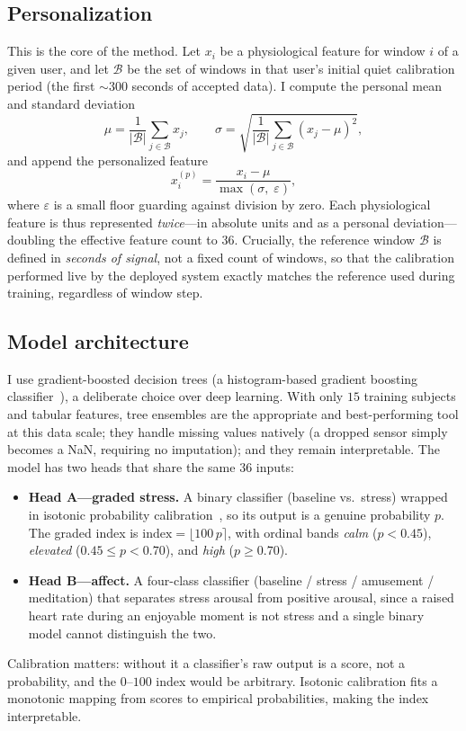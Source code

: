 \documentclass[11pt,a4paper]{article}
\begin{document}
\subsection{Personalization}
This is the core of the method. Let $x_{i}$ be a physiological feature for window $i$ of a given
user, and let $\mathcal{B}$ be the set of windows in that user's initial quiet calibration period
(the first $\sim\!300$ seconds of accepted data). I compute the personal mean and standard deviation
\begin{equation}
\mu = \frac{1}{|\mathcal{B}|}\sum_{j\in\mathcal{B}} x_j, \qquad
\sigma = \sqrt{\frac{1}{|\mathcal{B}|}\sum_{j\in\mathcal{B}} (x_j-\mu)^2},
\end{equation}
and append the personalized feature
\begin{equation}
x_i^{(p)} = \frac{x_i - \mu}{\max(\sigma,\;\varepsilon)},
\end{equation}
where $\varepsilon$ is a small floor guarding against division by zero. Each physiological feature
is thus represented \emph{twice}---in absolute units and as a personal deviation---doubling the
effective feature count to $36$. Crucially, the reference window $\mathcal{B}$ is defined in
\emph{seconds of signal}, not a fixed count of windows, so that the calibration performed live by the
deployed system exactly matches the reference used during training, regardless of window step.

\subsection{Model architecture}
I use gradient-boosted decision trees (a histogram-based gradient boosting
classifier~\cite{ke2017lightgbm}), a deliberate choice over deep learning. With only $15$ training
subjects and tabular features, tree ensembles are the appropriate and best-performing tool at this
data scale; they handle missing values natively (a dropped sensor simply becomes a NaN, requiring
no imputation); and they remain interpretable. The model has two heads that share the same $36$
inputs:
\begin{itemize}[leftmargin=1.4em,itemsep=0.1em]
  \item \textbf{Head A---graded stress.} A binary classifier (baseline vs.\ stress) wrapped in
        isotonic probability calibration~\cite{zadrozny2002transforming}, so its output is a genuine
        probability $p$. The graded index is $\mathrm{index}=\lfloor 100\,p \rceil$, with ordinal
        bands \emph{calm} ($p<0.45$), \emph{elevated} ($0.45\le p<0.70$), and \emph{high}
        ($p\ge 0.70$).
  \item \textbf{Head B---affect.} A four-class classifier
        (baseline / stress / amusement / meditation) that separates stress arousal from positive
        arousal, since a raised heart rate during an enjoyable moment is not stress and a single
        binary model cannot distinguish the two.
\end{itemize}
Calibration matters: without it a classifier's raw output is a score, not a probability, and the
$0$--$100$ index would be arbitrary. Isotonic calibration fits a monotonic mapping from scores to
empirical probabilities, making the index interpretable.
\end{document}
